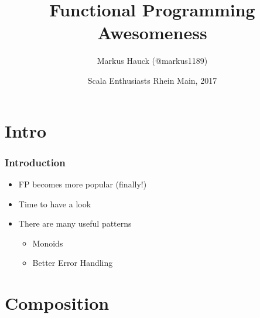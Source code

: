 \documentclass{beamer}
\title{Functional Programming Awesomeness}
\author{Markus Hauck (@markus1189)}
\date{Scala Enthusiasts Rhein Main, 2017}
\begin{document}
{
  \frame[plain]{\titlepage}
}

\section{Intro}
\label{sec:intro}

\begin{frame}
  \frametitle{Introduction}
  \begin{itemize}
  \item FP becomes more popular (finally!)
  \item Time to have a look
  \item There are many useful patterns
    \begin{itemize}
    \item Monoids
    \item Better Error Handling
    \end{itemize}
  \end{itemize}
\end{frame}

\section{Composition}
\end{document}

